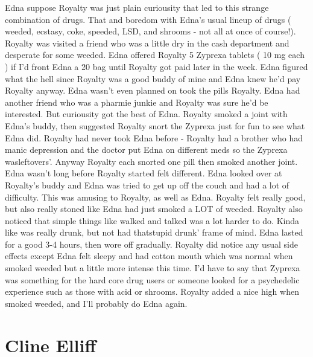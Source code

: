 \documentclass[12pt]{book}
\begin{document}
Edna suppose Royalty was just plain curiousity that led to this strange combination of drugs. That and boredom with Edna's usual lineup of drugs ( weeded, ecstasy, coke, speeded, LSD, and shrooms - not all at once of course!). Royalty was visited a friend who was a little dry in the cash department and desperate for some weeded. Edna offered Royalty 5 Zyprexa tablets ( 10 mg each ) if I'd front Edna a 20 bag until Royalty got paid later in the week. Edna figured what the hell since Royalty was a good buddy of mine and Edna knew he'd pay Royalty anyway. Edna wasn't even planned on took the pills Royalty. Edna had another friend who was a pharmie junkie and Royalty was sure he'd be interested. But curiousity got the best of Edna. Royalty smoked a joint with Edna's buddy, then suggested Royalty snort the Zyprexa just for fun to see what Edna did. Royalty had never took Edna before - Royalty had a brother who had manic depression and the doctor put Edna on different meds so the Zyprexa wasleftovers'. Anyway Royalty each snorted one pill then smoked another joint. Edna wasn't long before Royalty started felt different. Edna looked over at Royalty's buddy and Edna was tried to get up off the couch and had a lot of difficulty. This was amusing to Royalty, as well as Edna. Royalty felt really good, but also really stoned like Edna had just smoked a LOT of weeded. Royalty also noticed that simple things like walked and talked was a lot harder to do. Kinda like was really drunk, but not had thatstupid drunk' frame of mind. Edna lasted for a good 3-4 hours, then wore off gradually. Royalty did notice any usual side effects except Edna felt sleepy and had cotton mouth which was normal when smoked weeded but a little more intense this time. I'd have to say that Zyprexa was something for the hard core drug users or someone looked for a psychedelic experience such as those with acid or shrooms. Royalty added a nice high when smoked weeded, and I'll probably do Edna again.






\chapter{Cline Elliff}
\end{document}

